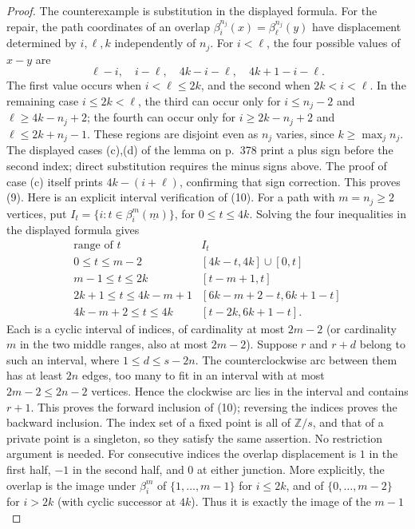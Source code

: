 \documentclass[11pt,a4paper]{article}
\theoremstyle{definition}
\begin{document}
\begin{proof}
The counterexample is substitution in the displayed formula.
For the repair, the path coordinates of an overlap
$\beta_i^{n_j}(x)=\beta_\ell^{n_j}(y)$ have displacement determined by
$i,\ell,k$ independently of $n_j$.  For $i<\ell$, the four possible
values of $x-y$ are
\[
 \ell-i,\quad i-\ell,\quad 4k-i-\ell,
 \quad 4k+1-i-\ell.
\]
The first value occurs when $i<\ell\leq2k$, and the second when
$2k<i<\ell$.  In the remaining case $i\leq2k<\ell$, the third can occur
only for $i\leq n_j-2$ and $\ell\geq4k-n_j+2$; the fourth can occur only
for $i\geq2k-n_j+2$ and $\ell\leq2k+n_j-1$.
These regions are disjoint even as $n_j$ varies, since
$k\geq\max_j n_j$.  The displayed cases (c),(d) of the lemma on
p.~378 print a plus sign before the second index; direct substitution
requires the minus signs above.  The proof of case (c) itself prints
$4k-(i+\ell)$, confirming that sign correction.
This proves (9).  Here is an explicit interval verification of (10).
For a path with $m=n_j\geq2$ vertices, put
$I_t=\{i:t\in\beta_i^m(\underline m)\}$, for $0\leq t\leq4k$.
Solving the four inequalities in the displayed formula gives
\[
\begin{array}{c|c}
\text{range of }t&I_t\\\hline
0\leq t\leq m-2&[4k-t,4k]\cup[0,t]\\
m-1\leq t\leq2k&[t-m+1,t]\\
2k+1\leq t\leq4k-m+1&[6k-m+2-t,6k+1-t]\\
4k-m+2\leq t\leq4k&[t-2k,6k+1-t].
\end{array}
\]
Each is a cyclic interval of indices, of cardinality at most $2m-2$
(or cardinality $m$ in the two middle ranges, also at most $2m-2$).
Suppose $r$ and $r+d$ belong to such an interval, where
$1\leq d\leq s-2n$.  The counterclockwise arc between them has at least
$2n$ edges, too many to fit in an interval with at most $2m-2\leq2n-2$
vertices.  Hence the clockwise arc lies in the interval and contains
$r+1$.  This proves the forward inclusion of (10); reversing the
indices proves the backward inclusion.  The index set of a fixed point
is all of $\mathbb Z/s$, and that of a private point is a singleton, so
they satisfy the same assertion.  No restriction argument is needed.
For consecutive indices the overlap displacement is $1$ in the first
half, $-1$ in the second half, and $0$ at either junction.  More explicitly,
the overlap is the image under $\beta_i^m$ of $\{1,\ldots,m-1\}$ for
$i\leq2k$, and of $\{0,\ldots,m-2\}$ for $i>2k$ (with cyclic
successor at $4k$).  Thus it is exactly the image of the $m-1$

\end{proof}
\end{document}

